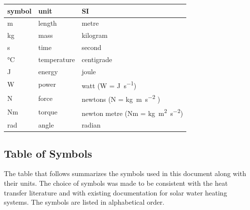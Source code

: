 \documentclass[12pt]{article}
\begin{document}
\renewcommand{\arraystretch}{1.2}
  \noindent \begin{tabular}{l l l} 
    \toprule		
    \textbf{symbol} & \textbf{unit} & \textbf{SI}\\
    \midrule 
    \si{\metre} & length & metre\\
    \si{\kilogram} & mass	& kilogram\\
    \si{\second} & time & second\\
    \si{\celsius} & temperature & centigrade\\
    \si{\joule} & energy & joule\\
    \si{\watt} & power & watt (W = \si{\joule\per\second})\\
    \si{\newton} & force & newtons (N = \si{\kilogram \metre\per\square\second} )\\
    Nm & torque & newton metre (Nm = \si{\kilogram \square\metre\per\square\second})\\
    \si{\radian} & angle & radian\\
    \bottomrule
  \end{tabular}

\subsection{Table of Symbols}

The table that follows summarizes the symbols used in this document along with
their units.  The choice of symbols was made to be consistent with the heat
transfer literature and with existing documentation for solar water heating
systems.  The symbols are listed in alphabetical order.
\end{document}
